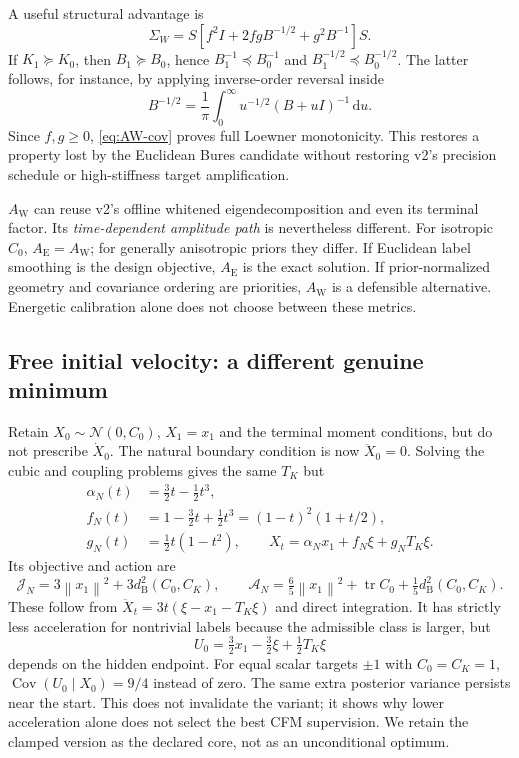 \documentclass[11pt,letterpaper]{article}
\newcommand{\cN}{\mathcal N}
\newcommand{\Cov}{\operatorname{Cov}}
\newcommand{\tr}{\operatorname{tr}}
\newcommand{\dd}{\,\mathrm d}
\newcommand{\norm}[1]{\left\lVert#1\right\rVert}
\newcommand{\bures}{d_{\mathrm B}}
\newcommand{\AltE}{A_{\mathrm E}}
\newcommand{\AltW}{A_{\mathrm W}}
\newcommand{\J}{\mathcal J}
\begin{document}
A useful structural advantage is
\begin{equation}
\Sigma_W=S[f^2I+2fgB^{-1/2}+g^2B^{-1}]S.
\label{eq:AW-cov}
\end{equation}
If $K_1\succeq K_0$, then $B_1\succeq B_0$, hence $B_1^{-1}\preceq B_0^{-1}$ and $B_1^{-1/2}\preceq B_0^{-1/2}$. The latter follows, for instance, by applying inverse-order reversal inside
\begin{equation}
B^{-1/2}=\frac1\pi\int_0^\infty u^{-1/2}(B+uI)^{-1}\dd u.
\end{equation}
Since $f,g\geq0$, \eqref{eq:AW-cov} proves full Loewner monotonicity. This restores a property lost by the Euclidean Bures candidate without restoring v2's precision schedule or high-stiffness target amplification.

$\AltW$ can reuse v2's offline whitened eigendecomposition and even its terminal factor. Its \emph{time-dependent amplitude path} is nevertheless different. For isotropic $C_0$, $\AltE=\AltW$; for generally anisotropic priors they differ. If Euclidean label smoothing is the design objective, $\AltE$ is the exact solution. If prior-normalized geometry and covariance ordering are priorities, $\AltW$ is a defensible alternative. Energetic calibration alone does not choose between these metrics.

\subsection{Free initial velocity: a different genuine minimum}
\label{sec:boundary-variants}
Retain $X_0\sim\cN(0,C_0)$, $X_1=x_1$ and the terminal moment conditions, but do not prescribe $\dot X_0$. The natural boundary condition is now $\ddot X_0=0$. Solving the cubic and coupling problems gives the same $T_K$ but
\begin{equation}
\begin{aligned}
\alpha_N(t)&=\tfrac32t-\tfrac12t^3,\\
f_N(t)&=1-\tfrac32t+\tfrac12t^3=(1-t)^2(1+t/2),\\
g_N(t)&=\tfrac12t(1-t^2),\qquad X_t=\alpha_Nx_1+f_N\xi+g_NT_K\xi.
\end{aligned}
\label{eq:natural}
\end{equation}
Its objective and action are
\begin{equation}
\J_N=3\norm{x_1}^2+3\bures^2(C_0,C_K),\qquad
\mathcal A_N=\tfrac65\norm{x_1}^2+\tr C_0+\tfrac15\bures^2(C_0,C_K).
\label{eq:natural-values}
\end{equation}
These follow from $\ddot X_t=3t(\xi-x_1-T_K\xi)$ and direct integration. It has strictly less acceleration for nontrivial labels because the admissible class is larger, but
\begin{equation}
U_0=\tfrac32x_1-\tfrac32\xi+\tfrac12T_K\xi
\end{equation}
depends on the hidden endpoint. For equal scalar targets $\pm1$ with $C_0=C_K=1$, $\Cov(U_0\mid X_0)=9/4$ instead of zero. The same extra posterior variance persists near the start. This does not invalidate the variant; it shows why lower acceleration alone does not select the best CFM supervision. We retain the clamped version as the declared core, not as an unconditional optimum.
\end{document}
